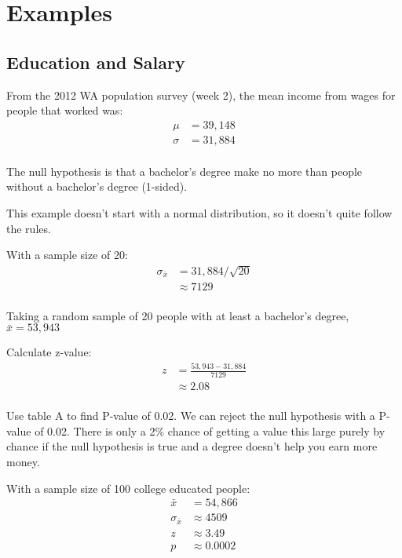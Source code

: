 \documentclass[landscape]{exam}
\begin{document}
  \section{Examples}

  \subsection{Education and Salary}

  From the 2012 WA population survey (week 2), the mean income from wages for
  people that worked was:
  \begin{align*}
    \mu    & = 39,148 \\
    \sigma & = 31,884 \\
  \end{align*}

  The null hypothesis is that a bachelor's degree make no more than people
  without a bachelor's degree (1-sided).

  This example doesn't start with a normal distribution, so it doesn't quite
  follow the rules.

  With a sample size of 20:
  \begin{align*}
    \sigma_{\bar{x}} & = 31,884 / \sqrt{20} \\
                     & \approx 7129 \\
  \end{align*}

  Taking a random sample of 20 people with at least a bachelor's degree, 
  $\bar{x} = 53,943$

  Calculate z-value:
  \begin{align*}
    z & = \frac{53,943 - 31,884}{7129} \\
      & \approx 2.08 \\
  \end{align*}

  Use table A to find P-value of 0.02. We can reject the null hypothesis with a
  P-value of 0.02. There is only a 2\% chance of getting a value this large
  purely by chance if the null hypothesis is true and a degree doesn't help you
  earn more money.

  With a sample size of 100 college educated people:
  \begin{align*}
    \bar{x}          & = 54,866 \\
    \sigma_{\bar{x}} & \approx 4509 \\
    z                & \approx 3.49 \\
    p                & \approx 0.0002 \\
  \end{align*}
\end{document}
